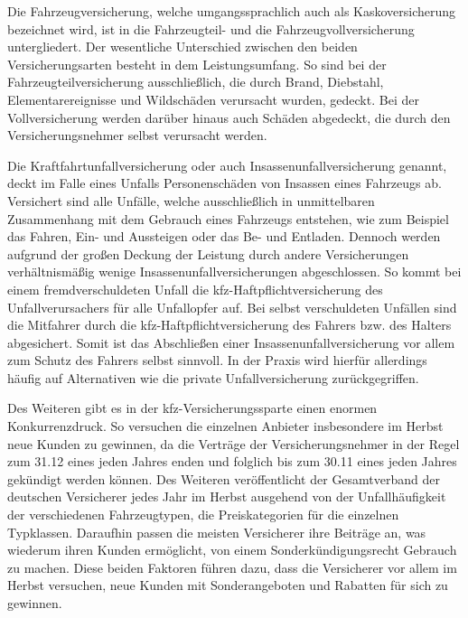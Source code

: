 Die Fahrzeugversicherung, welche umgangssprachlich auch als Kaskoversicherung bezeichnet wird, ist in die Fahrzeugteil- und die Fahrzeugvollversicherung untergliedert. Der wesentliche Unterschied zwischen den beiden Versicherungsarten besteht in dem Leistungsumfang. So sind bei der Fahrzeugteilversicherung ausschließlich, die durch Brand, Diebstahl, Elementarereignisse und Wildschäden verursacht wurden, gedeckt. Bei der Vollversicherung werden darüber hinaus auch Schäden abgedeckt, die durch den Versicherungsnehmer selbst verursacht werden.\autocite[Vgl.][S. 48]{FELTEN2012}

Die Kraftfahrtunfallversicherung oder auch Insassenunfallversicherung genannt, deckt im Falle eines Unfalls Personenschäden von Insassen eines Fahrzeugs ab. Versichert sind alle Unfälle, welche ausschließlich in unmittelbaren Zusammenhang mit dem Gebrauch eines Fahrzeugs entstehen, wie zum Beispiel das Fahren, Ein- und Aussteigen oder das Be- und Entladen.\autocite[Vgl.][S. 6f]{STADLER1998} Dennoch werden aufgrund der großen Deckung der Leistung durch andere Versicherungen verhältnismäßig wenige Insassenunfallversicherungen abgeschlossen. So kommt bei einem fremdverschuldeten Unfall die \ac{kfz}-Haftpflichtversicherung des Unfallverursachers für alle Unfallopfer auf. Bei selbst verschuldeten Unfällen sind die Mitfahrer durch die \ac{kfz}-Haftpflichtversicherung des Fahrers bzw. des Halters abgesichert. Somit ist das Abschließen einer Insassenunfallversicherung vor allem zum Schutz des Fahrers selbst sinnvoll.\autocite[Vgl.][S. 173f]{LAMMERS2006} In der Praxis wird hierfür allerdings häufig auf Alternativen wie die private Unfallversicherung zurückgegriffen.\autocite[Vgl.][]{GRATZLA2018}  

Des Weiteren gibt es in der \ac{kfz}-Versicherungssparte einen enormen Konkurrenzdruck. So versuchen die einzelnen Anbieter insbesondere im Herbst neue Kunden zu gewinnen, da die Verträge der Versicherungsnehmer in der Regel zum 31.12 eines jeden Jahres enden und folglich bis zum 30.11 eines jeden Jahres gekündigt werden können.\autocite[Vgl.][]{WARENTEST2022} Des Weiteren veröffentlicht der Gesamtverband der deutschen Versicherer jedes Jahr im Herbst ausgehend von der Unfallhäufigkeit der verschiedenen Fahrzeugtypen, die Preiskategorien für die einzelnen Typklassen. Daraufhin passen die meisten Versicherer ihre Beiträge an, was wiederum ihren Kunden ermöglicht, von einem Sonderkündigungsrecht Gebrauch zu machen.\autocite[Vgl.][]{NUS2022} Diese beiden Faktoren führen dazu, dass die Versicherer vor allem im Herbst versuchen, neue Kunden mit Sonderangeboten und Rabatten für sich zu gewinnen. 

